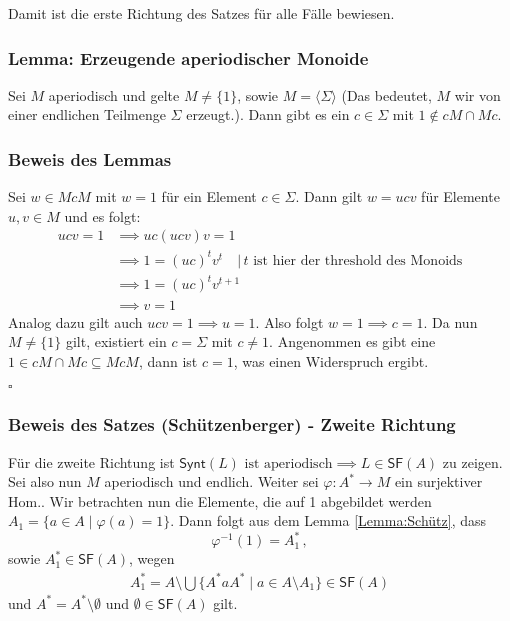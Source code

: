 \documentclass[12pt, german]{article}
\newcommand{\inv}{^{-1}}
\newcommand{\starfree}{\mathsf{SF}}
\newcommand{\synt}{\mathsf{Synt}}
\newcommand{\aast}{A^{\ast}}
\newcommand{\bewiesen}{
	
	\begin{flushright}
		$\square$  \\
\end{flushright}}
\begin{document}
	Damit ist die erste Richtung des Satzes für alle Fälle bewiesen. 
	
	\subsubsection{Lemma: Erzeugende aperiodischer Monoide \label{Lemma:Schütz}}
	Sei $M$ aperiodisch und gelte $M \not = \{1\}$, sowie $M = \langle \Sigma \rangle$ (Das bedeutet, $M$ wir von einer endlichen Teilmenge $\Sigma$ erzeugt.). 
	Dann gibt es ein $c \in \Sigma$ mit $1 \not \in cM \cap Mc$.
	
	\subsubsection{Beweis des Lemmas}
	Sei $w \in McM$ mit $w = 1$ für ein Element $c \in \Sigma$. Dann gilt $w = ucv$ für Elemente $u,v \in M$ und es folgt: 
	\begin{align*}
		ucv = 1 &\implies uc(ucv)v = 1 \\
		&\implies 1 = (uc)^t v^t \quad |\, t\text{ ist hier der threshold des Monoids}\\
		&\implies 1 = (uc)^t v^{t+1} \\
		&\implies v = 1
	\end{align*}
	Analog dazu gilt auch $ucv = 1 \implies u = 1$. Also folgt $w = 1 \implies c = 1$. 
	Da nun $M \not= \{1\}$ gilt, existiert ein $c = \Sigma$ mit $c \not = 1$. Angenommen es gibt eine $1 \in cM \cap Mc \subseteq McM$, dann ist $c = 1$, was einen Widerspruch ergibt.
	\bewiesen
	
	\subsubsection{Beweis des Satzes (Schützenberger) - Zweite Richtung}
	Für die zweite Richtung ist $\synt(L)\text{ ist aperiodisch} \implies L \in \starfree(A)$ zu zeigen.\\
	Sei also nun $M$ aperiodisch und endlich. Weiter sei $\varphi: \aast \to M$ ein surjektiver Hom.. 
	Wir betrachten nun die Elemente, die auf 1 abgebildet werden $A_1 = \{a \in A \mid \varphi(a) = 1\}$.
	Dann folgt aus dem Lemma \ref{Lemma:Schütz}, dass $$\varphi\inv(1) = \aast_1\, ,$$ sowie $\aast_1 \in \starfree(A)$, wegen
	\begin{align*}
		\aast_1 = A \setminus \bigcup \{\aast a \aast \mid  a \in A \setminus A_1\} \in \starfree(A)
	\end{align*}
	und $\aast = \aast \setminus \emptyset$ und $\emptyset \in \starfree(A)$ gilt.
	\newline
	
\end{document}
